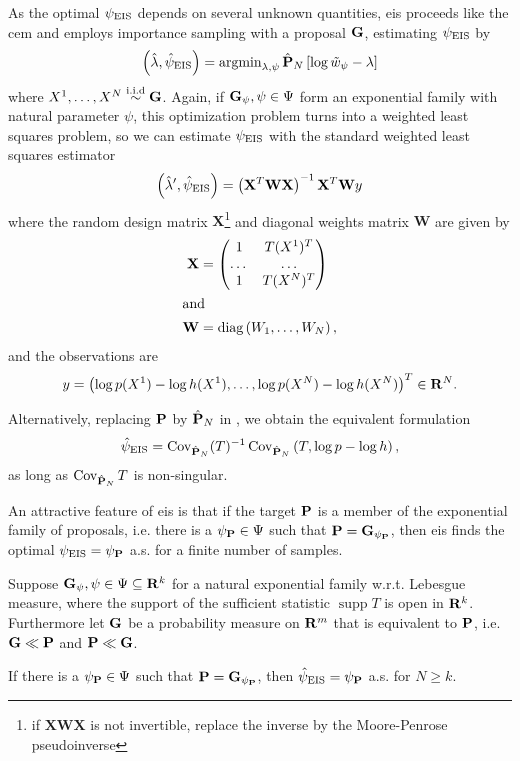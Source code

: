 As the optimal $\peis$ depends on several unknown quantities, \gls{eis} proceeds like the \gls{cem} and employs importance sampling with a proposal $\G$, estimating $\peis$ by
$$
\left(\hat \lambda,\hat \psi_{\text{EIS}}\right) = \argmin_{\lambda,\psi} \hat\P_{N} \left[ \log \tilde w_{\psi} - \lambda \right]
$$
where $X^{1}, \dots, X^{N} \iid \G$. 
Again, if $\G_{\psi}, \psi \in \Psi$ form an exponential family with natural parameter $\psi$, this optimization problem turns into a weighted least squares problem, so we can estimate $\peis$ with the standard weighted least squares estimator
$$
\left( \hat\lambda', \hpeis \right) = \left(\mathbf X^{T}\mathbf W\mathbf X\right)^{-1}\mathbf X^{T}\mathbf W y%
$$
where the random design matrix $\mathbf X$\footnote{if $\mathbf X\mathbf W \mathbf X$ is not invertible, replace the inverse by the Moore-Penrose pseudoinverse} and diagonal weights matrix $\mathbf W$ are given by
\begin{align*}
\mathbf X &= \begin{pmatrix}
    1 & T(X^{1})^{T} \\
    \dots&\dots\\
    1 & T(X^{N})^{T} \\
\end{pmatrix}\\
\intertext{and}
\mathbf W &= \text{diag} \left( W_{1}, \dots, W_{N} \right),
\end{align*}
and the observations are 
\begin{align*}
y = \left( \log p(X^{1}) - \log h(X^{1}), \dots, \log p(X^{N}) - \log h(X^{N}) \right)^{T} \in \R^{N}.
\end{align*}

Alternatively, replacing $\P$ by $\hat\P_{N}$ in , we obtain the equivalent formulation
\begin{align}
    \label{eq:hpeis-cov}
    \hpeis = \cov_{\hat\P_{N}} (T)^{-1} \cov_{\hat \P_{N}} \left( T, \log p - \log h \right),
\end{align}
as long as $\cov_{\hat \P_{N}} T$ is non-singular.

An attractive feature of \gls{eis} is that if the target $\P$ is a member of the exponential family of proposals, i.e. there is a $\psi_{\P}\in\Psi$ such that $\P = \G_{\psi_{\P}}$, then \gls{eis} finds the optimal $\peis = \psi_{\P}$ a.s. for a finite number of samples.

\begin{proposition}
    \label{prop:eis-finite-sample}
    Suppose $\G_{\psi}, \psi \in \Psi \subseteq \R^{k}$ for a natural exponential family w.r.t. Lebesgue measure, where the support of the sufficient statistic $\operatorname{supp} T$ is open in $\R^{k}$. 
    Furthermore let $\G$ be a probability measure on $\R^{m}$ that is equivalent to $\P$, i.e. $\G \ll \P$ and $\P \ll \G$. 

    If there is a $\psi_{\P} \in \Psi$ such that $\P = \G_{\psi_{\P}}$, then $\hpeis = \psi_{\P}$ a.s. for $N \geq k$. 
\end{proposition}

